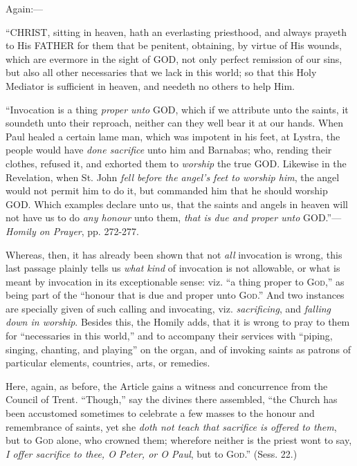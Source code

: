 Again:—

``CHRIST,
sitting in heaven, hath an everlasting priesthood, and always prayeth
to His FATHER for them
that be penitent, obtaining, by virtue of His wounds, which are
evermore in the sight of GOD,
not only perfect remission of our sins, but also all other necessaries
that we lack in this world; so that this Holy Mediator is sufficient
in heaven, and needeth no others to help Him.

``Invocation is a thing \emph{proper unto} GOD,
which if we attribute unto the saints, it soundeth unto their
reproach, neither can they well bear it at our hands. When Paul healed
a certain lame man, which was impotent in his feet, at Lystra, the
people would have \emph{done sacrifice} unto him and Barnabas; who,
rending their clothes, refused it, and exhorted them to \emph{worship}
the true GOD. Likewise in
the Revelation, when St. John \emph{fell before the angel's feet to
worship him}, the angel would not permit him to do it, but
commanded him that he should worship GOD.
Which examples declare unto us, that the saints and angels in heaven
will not have us to do \emph{any honour} unto them, \emph{that is due and proper
unto} GOD.''—\emph{Homily
on Prayer}, pp. 272-277.

Whereas, then, it has already been shown that not \emph{all}
invocation is wrong, this last passage plainly tells us \emph{what kind}
of invocation is not allowable, or what is meant by invocation in its
exceptionable sense: viz. ``a thing proper to G\textsc{od},''
as being part of the ``honour that is due and proper unto G\textsc{od}.''
And two instances are specially given of such calling and invocating,
viz. \emph{sacrificing}, and \emph{falling down in worship}. Besides
this, the Homily adds, that it is wrong to pray to them for
``necessaries in this world,'' and to accompany their
services with ``piping, singing, chanting, and playing'' on
the organ, and of invoking saints as patrons of particular elements,
countries, arts, or remedies.

Here, again, as before, the Article gains a witness and concurrence
from the Council of Trent. ``Though,'' say the divines there
assembled, ``the Church has been accustomed sometimes to celebrate
a few masses to the honour and remembrance of saints, yet she \emph{doth
not teach that sacrifice is offered to them}, but to G\textsc{od}
alone, who crowned them; wherefore neither is the priest wont to say, \emph{I
offer sacrifice to thee, O Peter, or O Paul}, but to G\textsc{od}.''
(Sess. 22.)

